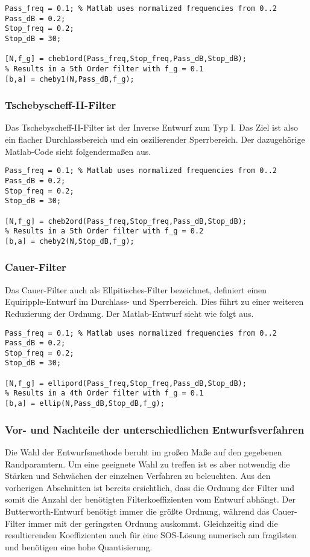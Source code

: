 \begin{verbatim}
Pass_freq = 0.1; % Matlab uses normalized frequencies from 0..2
Pass_dB = 0.2;
Stop_freq = 0.2;
Stop_dB = 30;

[N,f_g] = cheb1ord(Pass_freq,Stop_freq,Pass_dB,Stop_dB);
% Results in a 5th Order filter with f_g = 0.1
[b,a] = cheby1(N,Pass_dB,f_g);
\end{verbatim}

\subsubsection{Tschebyscheff-II-Filter}
Das Tschebyscheff-II-Filter ist der Inverse Entwurf zum Typ I. Das Ziel ist also ein
flacher Durchlassbereich und ein oszilierender Sperrbereich.
Der dazugehörige Matlab-Code sieht folgendermaßen aus.

\begin{verbatim}
Pass_freq = 0.1; % Matlab uses normalized frequencies from 0..2
Pass_dB = 0.2;
Stop_freq = 0.2;
Stop_dB = 30;

[N,f_g] = cheb2ord(Pass_freq,Stop_freq,Pass_dB,Stop_dB);
% Results in a 5th Order filter with f_g = 0.2
[b,a] = cheby2(N,Stop_dB,f_g);
\end{verbatim}

\subsubsection{Cauer-Filter}
Das Cauer-Filter auch als Ellpitisches-Filter bezeichnet, definiert einen
Equiripple-Entwurf im Durchlass- und Sperrbereich. Dies führt zu einer weiteren
Reduzierung der Ordnung. Der Matlab-Entwurf sieht wie folgt aus.
\begin{verbatim}
Pass_freq = 0.1; % Matlab uses normalized frequencies from 0..2
Pass_dB = 0.2;
Stop_freq = 0.2;
Stop_dB = 30;

[N,f_g] = ellipord(Pass_freq,Stop_freq,Pass_dB,Stop_dB);
% Results in a 4th Order filter with f_g = 0.1
[b,a] = ellip(N,Pass_dB,Stop_dB,f_g);
\end{verbatim}

\subsubsection{Vor- und Nachteile der unterschiedlichen Entwurfsverfahren}

Die Wahl der Entwurfsmethode beruht im großen Maße auf den gegebenen Randparamtern. Um eine geeignete
Wahl zu treffen ist es aber notwendig die Stärken und Schwächen der einzelnen Verfahren zu beleuchten.
Aus den vorherigen Abschnitten ist bereits ersichtlich, dass die Ordnung der Filter und somit die Anzahl der
benötigten Filterkoeffizienten vom Entwurf abhängt. Der Butterworth-Entwurf benötigt immer die größte
Ordnung, während das Cauer-Filter immer mit der geringsten Ordnung auskommt. Gleichzeitig sind die
resultierenden Koeffizienten auch für eine SOS-Lösung numerisch am fragilsten und benötigen eine hohe
Quantisierung.

